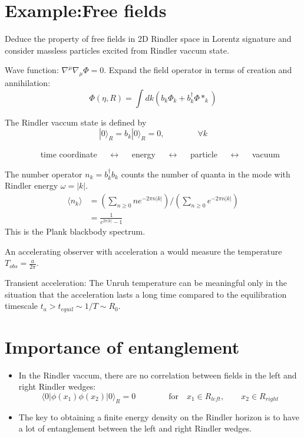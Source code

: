 \documentclass{article}
\def\ba{\begin{aligned}}
\def\ea{\end{aligned}}
\def\beq{\begin{eqnarray}}
\def\eeq{\end{eqnarray}}
\def\beq{\begin{equation}}
\def\eeq{\end{equation}}
\begin{document}
\section{Example:Free fields}
\begin{itemize}
\item{Deduce the property of free fields in 2D Rindler space in Lorentz signature and consider massless particles excited from Rindler vaccum state.   }
\item{Wave function: $\nabla^{\mu}\nabla_{\mu}\Phi=0$. Expand the field operator in terms of creation and annihilation:
\beq
\Phi(\eta,R)=\int dk\left( b_{k}\Phi_{k}+b_{k}^{\dagger}\Phi*_{k} \right)
\eeq
}
\item{The Rindler vaccum state is defined by
\beq
|0\rangle_{R}=b_{k}|0\rangle_{R}=0,\qquad\qquad  \forall k
\eeq
}
\item{$\qquad\qquad$ time coordinate $\quad\longleftrightarrow\quad$  energy $\quad\longleftrightarrow\quad$   particle  $\quad\longleftrightarrow\quad$  vacuum}
\item{The number operator $n_{k}=b^{\dagger}_{k}b_{k}$ counts the number of quanta in the mode with Rindler energy $\omega=|k|$.
\beq\ba
\langle
n_{k}\rangle &=\left( \sum_{n \geq 0} n e^{-2\pi n |k|}  \right)/\left( \sum_{n \geq 0}   e^{-2\pi n |k|}  \right)\\
            &=\frac{1}{e^{2\pi|k|}-1}
\ea
\eeq
This is the Plank blackbody spectrum.
\item{An accelerating observer with acceleration a would measure the temperature $T_{obs}=\frac{a}{2\pi}$}.
}
\item{Transient acceleration:
The Unruh temperature can be meaningful only in the situation that the acceleration lasts a long time compared to the equilibration timescale
$t_{a}>t_{equil}\sim 1/T\sim R_{0}$.
}
\end{itemize}
\section{Importance of entanglement}
\begin{itemize}
\item{In the Rindler vaccum, there are no correlation between fields in the left and right Rindler wedges:
\beq
\langle 0|\phi(x_{1})\phi(x_{2})|0\rangle_{R}=0 \qquad\qquad \mbox{for} \quad x_{1}\in R_{left},\qquad x_{2}\in R_{right}
\eeq
}
\item{The key to obtaining a finite energy density on the Rindler horizon is to have a lot of entanglement between the left and right Rindler wedges.}\\~~\\

\end{itemize}
\end{document}
